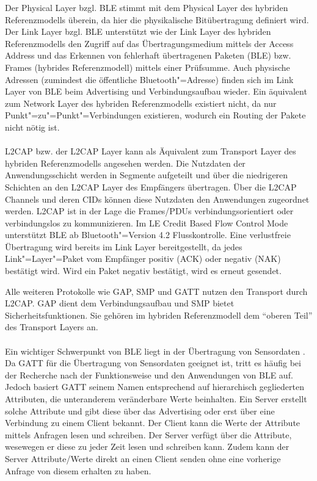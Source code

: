 Der Physical Layer bzgl. BLE stimmt mit dem Physical Layer des hybriden Referenzmodells überein, da hier die physikalische Bitübertragung definiert wird. Der Link Layer bzgl. BLE unterstützt wie der Link Layer des hybriden Referenzmodells den Zugriff auf das Übertragungsmedium mittels der Access Address und das Erkennen von fehlerhaft übertragenen Paketen (BLE) bzw. Frames (hybrides Referenzmodell) mittels einer Prüfsumme. Auch physische Adressen (zumindest die öffentliche Bluetooth"=Adresse) finden sich im Link Layer von BLE beim Advertising und Verbindungsaufbau wieder. Ein äquivalent zum Network Layer des hybriden Referenzmodells existiert nicht, da nur Punkt"=zu"=Punkt"=Verbindungen existieren, wodurch ein Routing der Pakete nicht nötig ist.
\\\\
L2CAP bzw. der L2CAP Layer kann als Äquivalent zum Transport Layer des hybriden Referenzmodells angesehen werden. Die Nutzdaten der Anwendungsschicht werden in Segmente aufgeteilt und über die niedrigeren Schichten an den L2CAP Layer des Empfängers übertragen. Über die L2CAP Channels und deren CIDs können diese Nutzdaten den Anwendungen zugeordnet werden. L2CAP ist in der Lage die Frames/PDUs verbindungsorientiert oder verbindungslos zu kommunizieren. Im LE Credit Based Flow Control Mode unterstützt BLE ab Bluetooth"=Version 4.2 Flusskontrolle. Eine verlustfreie Übertragung wird bereits im Link Layer bereitgestellt, da jedes Link"=Layer"=Paket vom Empfänger positiv (ACK) oder negativ (NAK) bestätigt wird. Wird ein Paket negativ bestätigt, wird es erneut gesendet.

Alle weiteren Protokolle wie GAP, SMP und GATT nutzen den Transport durch L2CAP. GAP dient dem Verbindungsaufbau und SMP bietet Sicherheitsfunktionen. Sie gehören im hybriden Referenzmodell dem "`oberen Teil"' des Transport Layers an.
\\\\
Ein wichtiger Schwerpunkt von BLE liegt in der Übertragung von Sensordaten \cite{BtDataTransfer}. Da GATT für die Übertragung von Sensordaten geeignet ist, tritt es häufig bei der Recherche nach der Funktionsweise und den Anwendungen von BLE auf. Jedoch basiert GATT seinem Namen entsprechend auf hierarchisch gegliederten Attributen, die unteranderem veränderbare Werte beinhalten. Ein Server erstellt solche Attribute und gibt diese über das Advertising oder erst über eine Verbindung zu einem Client bekannt. Der Client kann die Werte der Attribute mittels Anfragen lesen und schreiben. Der Server verfügt über die Attribute, wesewegen er diese zu jeder Zeit lesen und schreiben kann. Zudem kann der Server Attribute/Werte direkt an einen Client senden ohne eine vorherige Anfrage von diesem erhalten zu haben. 


